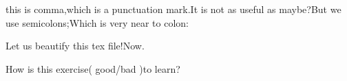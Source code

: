 \documentclass{article}
\begin{document}
this is comma,which is a punctuation mark.It is not as useful as maybe?But we use semicolons;Which is very near to colon:

Let us beautify this tex file!Now.

How is this exercise(  good/bad  )to learn?
\end{document}
